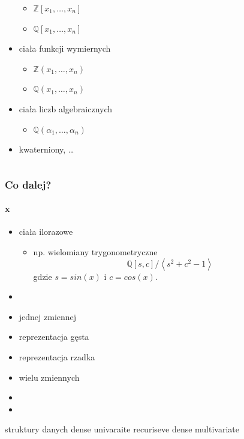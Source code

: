 \documentclass{beamer}
\begin{document}
\begin{frame}
\begin{columns}
\begin{column}[r]{0.5\textwidth}
\begin{itemize}
\begin{itemize}
                        \item $\mathbb{Z}[x_1,\ldots,x_n]$
                        \item $\mathbb{Q}[x_1,\ldots,x_n]$
                    \end{itemize}
                \item ciała funkcji wymiernych
                    \begin{itemize}
                        \item $\mathbb{Z}(x_1,\ldots,x_n)$
                        \item $\mathbb{Q}(x_1,\ldots,x_n)$
                    \end{itemize}
                \item ciała liczb algebraicznych
                    \begin{itemize}
                        \item $\mathbb{Q}(\alpha_1,\ldots,\alpha_n)$
                    \end{itemize}
                \item kwaterniony, \ldots
            \end{itemize}
        \end{column}
    \end{columns}
\end{frame}

\begin{frame}
    \frametitle{Co dalej?}
    \framesubtitle{x}

    \begin{itemize}
        \item ciała ilorazowe
            \begin{itemize}
                \item np. wielomiany trygonometryczne
                    \begin{equation*}
                        \mathbb{Q}[s, c] / \left\langle s^2 + c^2 - 1 \right\rangle
                    \end{equation*}
                    gdzie $s = sin(x)$ i $c = cos(x)$.
            \end{itemize}
        \item
    \end{itemize}
\end{frame}


    \begin{itemize}
        \item jednej zmiennej
            \item reprezentacja gęsta
            \item reprezentacja rzadka
        \item wielu zmiennych
            \item
        \item
    \end{itemize}
    struktury danych
        dense univaraite
        recuriseve dense multivariate
\end{document}
